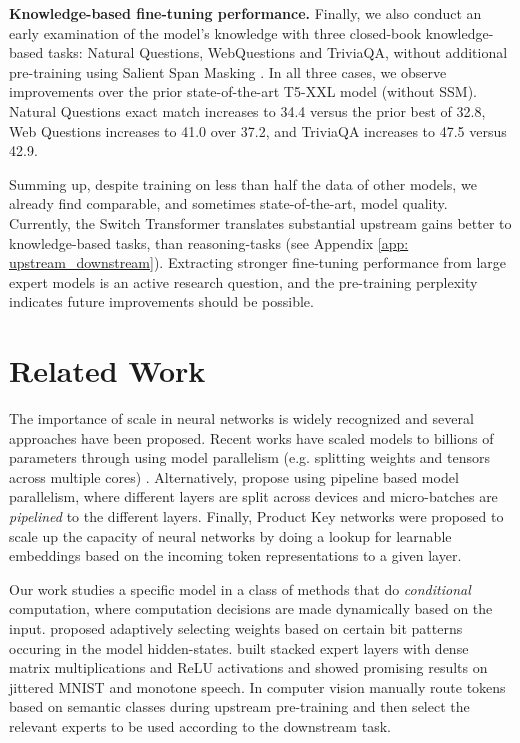 \documentclass[twoside,11pt]{article}
\begin{document}
\textbf{Knowledge-based fine-tuning performance.} Finally, we also conduct an early examination of the model's knowledge with three closed-book knowledge-based tasks: Natural Questions, WebQuestions and TriviaQA, without additional pre-training using Salient Span Masking \citep{guu2020realm}.
In all three cases, we observe improvements over the prior state-of-the-art T5-XXL model (without SSM).
Natural Questions exact match increases to 34.4 versus the prior best of 32.8, Web Questions increases to 41.0 over 37.2, and TriviaQA increases to 47.5 versus 42.9. 

Summing up, despite training on less than half the data of other models, we already find comparable, and sometimes state-of-the-art, model quality.
Currently, the Switch Transformer translates substantial upstream gains better to knowledge-based tasks, than reasoning-tasks (see Appendix 
\ref{app: upstream_downstream}).
Extracting stronger fine-tuning performance from large expert models is an active research question, and the pre-training perplexity indicates future improvements should be possible.



\section{Related Work}
The importance of scale in neural networks is widely recognized and several approaches have been proposed.
Recent works have scaled models to billions of parameters through using model parallelism (e.g. splitting weights and tensors across multiple cores) \citep{shazeer2018mesh,rajbhandari2019zero,raffel2019exploring,brown2020language,shoeybi2019megatron}.
Alternatively, \cite{harlap2018pipedream,huang2019gpipe} propose using pipeline based model parallelism, where different layers are split across devices and micro-batches are \emph{pipelined} to the different layers.
Finally, Product Key networks \citep{lample2019large} were proposed to scale up the capacity of neural networks by doing a lookup for learnable embeddings based on the incoming token representations to a given layer.

Our work studies a specific model in a class of methods that do \emph{conditional} computation, where computation decisions are made dynamically based on the input. 
\cite{cho2014exponentially} proposed adaptively selecting weights based on certain bit patterns occuring in the model hidden-states. 
\cite{eigen2013learning} built stacked expert layers with dense matrix multiplications and ReLU activations and showed promising results on jittered MNIST and monotone speech.
In computer vision \cite{puigcerver2020scalable} manually route tokens based on semantic classes during upstream pre-training and then select the relevant experts to be used according to the downstream task.
\end{document}
